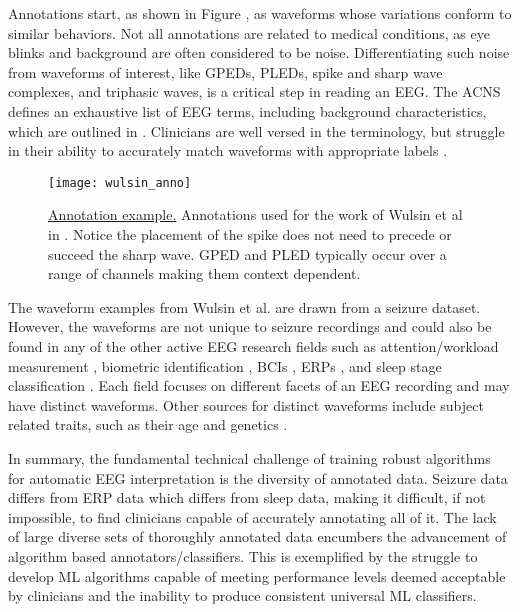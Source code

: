 Annotations start, as shown in Figure , as waveforms whose variations conform to similar behaviors. Not all annotations are related to medical conditions, as eye blinks and background are often considered to be noise. Differentiating such noise from waveforms of interest, like \acp{GPED}, \acp{PLED}, spike and sharp wave complexes, and triphasic waves, is a critical step in reading an \ac{EEG}. The \ac{ACNS} defines an exhaustive list of \ac{EEG} terms, including background characteristics, which are outlined in \cite{Westhall2015}. Clinicians are well versed in the terminology, but struggle in their ability to accurately match waveforms with appropriate labels \cite{Gerber2008}.

\begin{figure}
\centering
\texttt{[image: wulsin\_anno]}
\caption[Annotation Example]{\underline{Annotation example.} Annotations used for the work of Wulsin et al in \cite{Wulsin2011}. Notice the placement of the spike does not need to precede or succeed the sharp wave. \ac{GPED} and \ac{PLED} typically occur over a range of channels making them context dependent.}
\label{fig:wulsin_anno}
\end{figure}

The waveform examples from Wulsin et al. \cite{Wulsin2011} are drawn from a seizure dataset. However, the waveforms are not unique to seizure recordings and could also be found in any of the other active \ac{EEG} research fields such as attention/workload measurement \cite{Wang2012}, biometric identification \cite{Rocca2012}, \acp{BCI} \cite{Lance2012}, \acp{ERP} \cite{Makeig2012}, and sleep stage classification \cite{Schluter2012}. Each field focuses on different facets of an \ac{EEG} recording and may have distinct waveforms. Other sources for distinct waveforms include subject related traits, such as their age \cite{Warby2014,Clarke2001} and genetics \cite{Begleiter2006}.

In summary, the fundamental technical challenge of training robust algorithms for automatic \ac{EEG} interpretation is the diversity of annotated data. Seizure data differs from \ac{ERP} data which differs from sleep data, making it difficult, if not impossible, to find clinicians capable of accurately annotating all of it. The lack of large diverse sets of thoroughly annotated data encumbers the advancement of algorithm based annotators/classifiers. This is exemplified by the struggle to develop \ac{ML} algorithms capable of meeting performance levels deemed acceptable by clinicians and the inability to produce consistent universal \ac{ML} classifiers.

